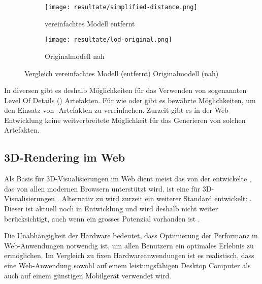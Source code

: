 \begin{figure}[H]
  \centering
  \begin{subfigure}{.4\textwidth}
    \centering
    \texttt{[image: resultate/simplified-distance.png]}
    \caption{vereinfachtes Modell entfernt}
    \label{fig:lodComparisonSimplified}
  \end{subfigure}
  \begin{subfigure}{.4\textwidth}
    \centering
    \texttt{[image: resultate/lod-original.png]}
    \caption{Originalmodell nah}
    \label{fig:lodComparisonOriginal}
  \end{subfigure}
  \caption{Vergleich vereinfachtes Modell (entfernt) Originalmodell (nah)}
\end{figure}

In diversen  gibt es deshalb Möglichkeiten für das Verwenden von sogenannten Level Of Details () Artefakten.
Für  wie  oder  gibt es bewährte Möglichkeiten, um den Einsatz von -Artefakten zu vereinfachen. Zurzeit gibt es in der Web-Entwicklung keine weitverbreitete Möglichkeit für das Generieren von solchen Artefakten.

\subsection{3D-Rendering im Web}

Als Basis für 3D-Visualisierungen im Web dient meist das von der  entwickelte , das von allen modernen Browsern unterstützt wird.  ist eine  für 3D-Visualisierungen \cite{webGl1Spec}.
Alternativ zu  wird zurzeit ein weiterer Standard entwickelt: . Dieser ist aktuell noch in Entwicklung und wird deshalb nicht weiter berücksichtigt, auch wenn ein grosses Potenzial vorhanden ist \cite{webGPUCharter}.

Die Unabhängigkeit der Hardware bedeutet, dass Optimierung der Performanz in Web-Anwendungen notwendig ist, um allen Benutzern ein optimales Erlebnis zu ermöglichen.
Im Vergleich zu fixen Hardwareanwendungen ist es realistisch, dass eine Web-Anwendung sowohl auf einem leistungsfähigen Desktop Computer als auch auf einem günstigen Mobilgerät verwendet wird.


